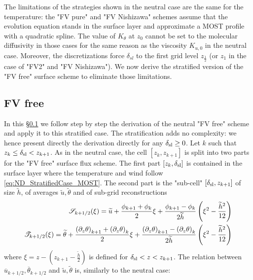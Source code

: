 The limitations of the strategies shown in the neutral case are the
same for the temperature: the "FV pure" and "FV Nishizawa" schemes
assume that the evolution equation stands
in the surface layer and approximate a MOST profile with
a quadratic spline.
The value of $K_\theta$ at $z_0$ cannot be set to the molecular
diffusivity in those cases for the same reason as the
viscosity $K_{u,0}$ in the neutral case.
%
Moreover, the discretizations force $\delta_{sl}$ to the first
grid level $z_{\frac{1}{2}}$ (or $z_1$ in the case of "FV2" and
"FV Nishizawa").
We now derive the stratified version of the "FV free" surface scheme
to eliminate those limitations.
\subsection{FV free}
\label{sec:ND_StratifiedCase_FVfree}
In this \S \ref{sec:ND_StratifiedCase_FVfree} we follow
step by step the derivation of the neutral "FV free" scheme and
apply it to this stratified case. The stratification adds no
complexity: we hence present directly the derivation directly for
any $\delta_{\rm sl} \geq 0$.
Let $k$ such that $z_k \leq \delta_{\rm sl} < z_{k+1}$.
As in the neutral case, the cell $[z_k, z_{k+1}]$ is split
into two parts for the "FV free" surface flux scheme.
The first part $[z_k,\delta_{\rm sl}]$ is contained
in the surface layer where the temperature and wind
follow \eqref{eq:ND_StratifiedCase_MOST}.
The second part is the
"sub-cell" $[\delta_{\rm sl}, z_{k+1}]$ of size $\widetilde{h}$, of
averages $\widetilde{u}, \widetilde{\theta}$
and of sub-grid reconstructions
\begin{equation}
\begin{aligned}
{\cal S}_{k+1/2}(\xi) = \widetilde{u} +
	\frac{\phi_{k+1} + \phi_{k}}{2} \xi
+ \frac{\phi_{k+1} - \phi_{k}}{2\widetilde{h}}
	\left(\xi^2 - \frac{\widetilde{h}^2}{12}\right) \\
{\cal T}_{k+1/2}(\xi) = \widetilde{\theta} +
	\frac{{(\partial_z \theta)}_{k+1} + 
		{(\partial_z \theta)}_{k}}{2} \xi
+ \frac{{(\partial_z \theta)}_{k+1} - {(\partial_z \theta)}_{k}}
	{2\widetilde{h}}
	\left(\xi^2 - \frac{\widetilde{h}^2}{12}\right)
\end{aligned}
\end{equation}
where $\xi = z - (z_{k+1} - \frac{\widetilde{h}}{2})$ is defined
for $\delta_{\rm sl} < z < z_{k+1}$.
The relation between
$\overline{u}_{k+1/2}, \overline{\theta}_{k+1/2}$ and
$\widetilde{u},\widetilde{\theta}$ is, similarly to the neutral case:
